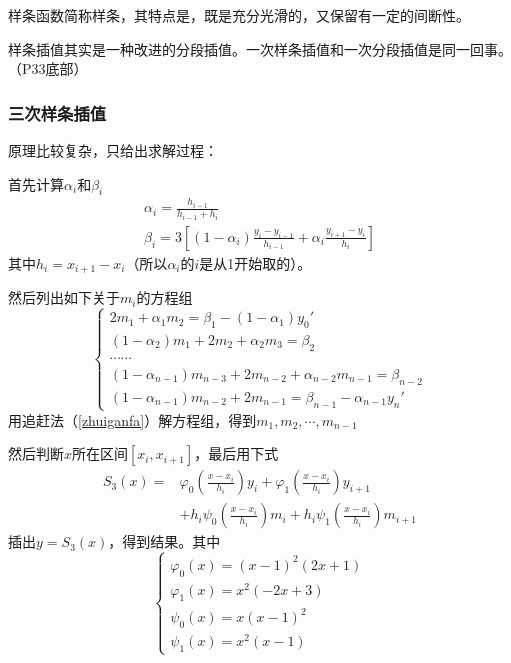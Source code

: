 \documentclass[fontset=ubuntu]{ctexart}
\numberwithin{equation}{section}
\numberwithin{theorem}{section}
\begin{document}
\begin{multicols}{2}
    样条函数简称样条，其特点是，既是充分光滑的，又保留有一定的间断性。

    样条插值其实是一种改进的分段插值。一次样条插值和一次分段插值是同一回事。（P33底部）

    \subsubsection{三次样条插值}

    原理比较复杂，只给出求解过程：

    首先计算$\alpha_i$和$\beta_i$
    \begin{gather}
        \alpha_i = \frac{h_{i-1}}{h_{i-1}+h_i} \\
        \beta_i = 3\left[(1-\alpha_i)\frac{y_i-y_{i-1}}{h_{i-1}}+\alpha_i\frac{y_{i+1}-y_i}{h_i}\right]
    \end{gather}
    其中$h_i=x_{i+1}-x_i$（所以$\alpha_i$的$i$是从1开始取的）。

    然后列出如下关于$m_i$的方程组
    \begin{equation}
        \left\{\begin{array}{l}
            2m_1+\alpha_1 m_2 = \beta_1-(1-\alpha_1)y_0' \\
            (1-\alpha_2)m_1+2m_2+\alpha_2 m_3 = \beta_2 \\
            \cdots\cdots \\
            (1-\alpha_{n-1})m_{n-3}+2m_{n-2}+\alpha_{n-2}m_{n-1} = \beta_{n-2} \\
            (1-\alpha_{n-1})m_{n-2}+2m_{n-1}=\beta_{n-1}-\alpha_{n-1}y_n'
        \end{array}\right.
    \end{equation}
    用追赶法（\ref{zhuiganfa}）解方程组，得到$m_1,m_2,\cdots,m_{n-1}$

    然后判断$x$所在区间$[x_i,x_{i+1}]$，最后用下式
    \begin{align}
        S_3(x)=&\varphi_0\left(\frac{x-x_i}{h_i} \right ) y_i+\varphi_1\left(\frac{x-x_i}{h_i} \right )y_{i+1}\nonumber \\
        &+h_i\psi _0\left(\frac{x-x_i}{h_i} \right )m_i+h_i\psi_1\left(\frac{x-x_i}{h_i} \right )m_{i+1}
    \end{align}
    插出$y=S_3(x)$，得到结果。其中
    \begin{equation}
        \label{phi_and_psi}
        \left\{\begin{array}{l}
            \varphi_0(x) = (x-1)^2(2x+1) \\
        \varphi_1(x) = x^2(-2x+3) \\
        \psi_0(x) = x(x-1)^2 \\
        \psi_1(x) = x^2(x-1)
        \end{array}\right.
    \end{equation}


\end{multicols}
\end{document}
